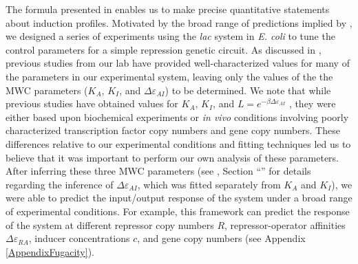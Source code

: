 The formula presented in  enables us to make
precise quantitative statements about induction profiles. Motivated by the broad
range of predictions implied by , we designed a series of experiments using the
\textit{lac} system in \textit{E. coli} to tune the control parameters for a
simple repression genetic circuit. As discussed in \fref[figInductionCorepressionPhenotypicProperties],
previous studies from our lab have provided well-characterized values
for many of the parameters in our experimental system, leaving only the values
of the the MWC parameters ($K_A$, $K_I$, and $\Delta \varepsilon_{AI}$) to be
determined. We note that while previous studies have obtained values for $K_A$,
$K_I$, and $L=e^{-\beta \Delta \varepsilon_{AI}}$ \citep{OGorman1980,
Daber2011a}, they were either based upon biochemical experiments or
\textit{in vivo} conditions involving poorly characterized transcription factor
copy numbers and gene copy numbers. These differences relative to our
experimental conditions and fitting techniques led us to believe that it was
important to perform our own analysis of these parameters. After
inferring these three MWC parameters (see , Section
``'' for details regarding the inference of $\Delta
\varepsilon_{AI}$, which was fitted separately from $K_A$ and $K_I$), we were
able to predict the input/output response of the system under a broad range of
experimental conditions. For example, this framework can predict the response of
the system at different repressor copy numbers $R$, repressor-operator
affinities $\Delta\varepsilon_{RA}$, inducer concentrations $c$, and gene copy
numbers (see Appendix \ref{AppendixFugacity}).
